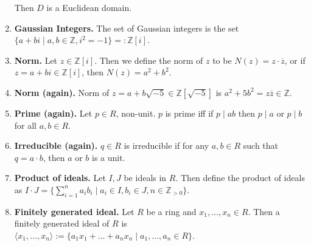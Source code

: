 \begin{enumerate}
	Then $D$ is a Euclidean domain. 
	\item \textbf{Gaussian Integers. } The set of Gaussian integers is the set $\{a + bi \mid a,b \in \mathbb{Z}, i^2 = -1\} =: \mathbb{Z}[i]$. 
	\item \textbf{Norm. } Let $z \in \mathbb{Z}[i]$. Then we define the norm of $z$ to be $N(z)=z \cdot \overline{z}$, or if $z=a+bi \in \mathbb{Z}[i]$, then $N(z) = a^2 + b^2$. 
	\item \textbf{Norm (again). } Norm of $z = a+b\sqrt{-5} \in \mathbb{Z}[\sqrt{-5}]$ is $a^2 + 5b^2 = z\overline{z} \in \mathbb{Z}$. 
	\item \textbf{Prime (again). } Let $p \in R$, non-unit. $p$ is prime iff if $p \mid ab$ then $p \mid a $ or $p \mid b$ for all $a,b \in R$. 
	\item \textbf{Irreducible (again). } $q \in R$ is irreducible if for any $a,b \in R$ such that $q = a \cdot b$, then $a$ or $b$ is a unit. 
	\item \textbf{Product of ideals. } Let $I,J$ be ideals in $R$. Then define the product of ideals as $I \cdot J = \{\sum_{i=1}^{n} a_ib_i \mid a_i \in I, b_i \in J, n \in \mathbb{Z}_{>0}\}$. 
	\item \textbf{Finitely generated ideal. } Let $R$ be a ring and $x_1,\dots,x_n \in R$. Then a finitely generated ideal of $R$ is $\langle x_1,\dots,x_n \rangle := \{a_1x_1 + \dots + a_nx_n \mid a_1,\dots,a_n \in R\}$. 
\end{enumerate}



